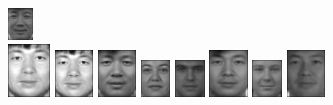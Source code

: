 \begin{figure}[hbt]
  \includegraphics[width=0.06\textwidth]{../results/H_rez/correct95/1/10.jpg} \\
  \vspace{4pt}
  \includegraphics[width=0.1\textwidth]{../results/H_rez/correct95/2/testImg.jpg} \vline
  \hspace{2pt}
  \includegraphics[width=0.09\textwidth]{../results/H_rez/correct95/2/1.jpg}
  \includegraphics[width=0.09\textwidth]{../results/H_rez/correct95/2/2.jpg}
  \includegraphics[width=0.07\textwidth]{../results/H_rez/correct95/2/3.jpg}
  \includegraphics[width=0.07\textwidth]{../results/H_rez/correct95/2/4.jpg}
  \includegraphics[width=0.09\textwidth]{../results/H_rez/correct95/2/5.jpg}
  \includegraphics[width=0.07\textwidth]{../results/H_rez/correct95/2/6.jpg}
  \includegraphics[width=0.09\textwidth]{../results/H_rez/correct95/2/7.jpg}

\end{figure}
